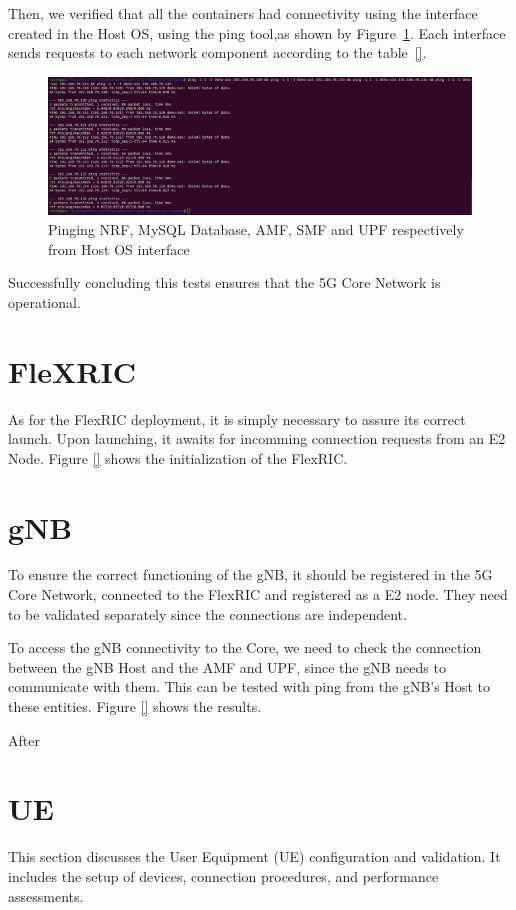     Then, we verified that all the containers had connectivity using the interface created in the Host OS, using the ping tool,as shown by Figure~\ref{fig:ping_core}.
    Each interface sends requests to each network component according to the table~\ref{}.

\begin{figure}[H]
\centering
\includegraphics[width=0.5\linewidth]{figures/ping_core}
\caption[Pinging NRF, MySQL Database, AMF, SMF and UPF respectively from Host OS
interface]{Pinging NRF, MySQL Database, AMF, SMF and UPF respectively from Host OS
interface}
\label{fig:ping_core}
\end{figure}

Successfully concluding this tests ensures that the 5G Core Network is operational.



\section{FleXRIC}\label{sec:flexric}
As for the FlexRIC deployment, it is simply necessary to assure its correct launch. Upon launching, it awaits for incomming connection requests from an E2 Node.
Figure \ref{} shows the initialization of the FlexRIC.


\section{gNB}\label{sec:gnb}
To ensure the correct functioning of the gNB, it should be registered in the 5G Core Network, connected to the FlexRIC and registered as a E2 node.
They need to be validated separately since the connections are independent.

To access the gNB connectivity to the Core, we need to check the connection between the gNB Host and the AMF and UPF, since the gNB needs to communicate with them.
This can be tested with ping from the gNB's Host to these entities. Figure \ref{} shows the results.


After

\section{UE}\label{sec:ue}
This section discusses the User Equipment (UE) configuration and validation. It includes the setup of devices, connection procedures, and performance assessments.

